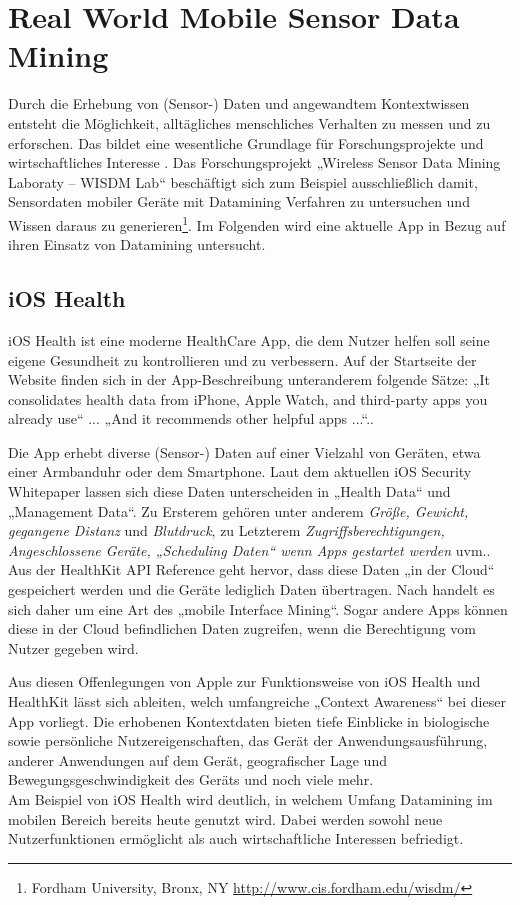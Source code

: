 \chapter{Real World Mobile Sensor Data Mining}
\label{chap:realworld}

Durch die Erhebung von (Sensor-) Daten und angewandtem Kontextwissen entsteht die Möglichkeit, alltägliches menschliches Verhalten zu messen und zu erforschen. Das bildet eine wesentliche Grundlage für Forschungsprojekte und wirtschaftliches Interesse \cite{lockhart2011}. Das Forschungsprojekt „Wireless Sensor Data Mining Laboraty -- WISDM Lab“ beschäftigt sich zum Beispiel ausschließlich damit, Sensordaten mobiler Geräte mit Datamining Verfahren zu untersuchen und Wissen daraus zu generieren\footnote{Fordham University, Bronx, NY \url{http://www.cis.fordham.edu/wisdm/}}. Im Folgenden wird eine aktuelle App in Bezug auf ihren Einsatz von Datamining untersucht.

\section{iOS Health}

iOS Health ist eine moderne HealthCare App, die dem Nutzer helfen soll seine eigene Gesundheit zu kontrollieren und zu verbessern. Auf der Startseite der Website finden sich in der App-Beschreibung unteranderem folgende Sätze: „It consolidates health data from iPhone, Apple Watch, and third-party apps you already use“ ... „And it recommends other helpful apps ...“.\cite{iosHealth}.

Die App erhebt diverse (Sensor-) Daten auf einer Vielzahl von Geräten, etwa einer Armbanduhr oder dem Smartphone. Laut dem aktuellen iOS Security Whitepaper lassen sich diese Daten unterscheiden in „Health Data“ und „Management Data“\cite{iosSecurity}. Zu Ersterem gehören unter anderem \emph{Größe, Gewicht, gegangene Distanz} und \emph{Blutdruck}, zu Letzterem \emph{Zugriffsberechtigungen, Angeschlossene Geräte, „Scheduling Daten“ wenn Apps gestartet werden} uvm.\cite{iosSecurity}. Aus der HealthKit API Reference \cite{hkApi} geht hervor, dass diese Daten „in der Cloud“ gespeichert werden und die Geräte lediglich Daten übertragen. Nach \cite{pocket2014} handelt es sich daher um eine Art des „mobile Interface Mining“. Sogar andere Apps können diese in der Cloud befindlichen Daten zugreifen, wenn die Berechtigung vom Nutzer gegeben wird.

Aus diesen Offenlegungen von Apple zur Funktionsweise von iOS Health und HealthKit lässt sich ableiten, welch umfangreiche „Context Awareness“ bei dieser App vorliegt. Die erhobenen Kontextdaten bieten tiefe Einblicke in biologische sowie persönliche Nutzereigenschaften, das Gerät der Anwendungsausführung, anderer Anwendungen auf dem Gerät, geografischer Lage und Bewegungsgeschwindigkeit des Geräts und noch viele mehr.\\

Am Beispiel von iOS Health wird deutlich, in welchem Umfang Datamining im mobilen Bereich bereits heute genutzt wird. Dabei werden sowohl neue Nutzerfunktionen ermöglicht als auch wirtschaftliche Interessen befriedigt.